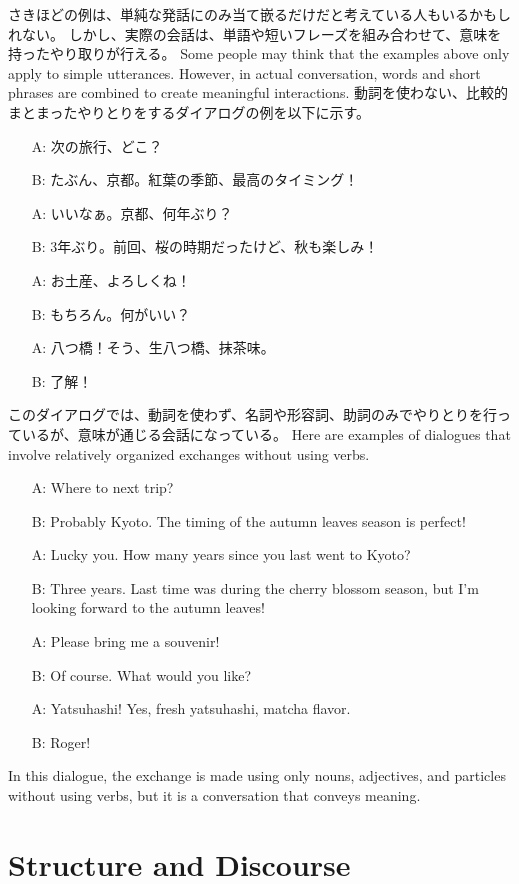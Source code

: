 \documentclass[uplatex,dvipdfmx,b5paper,english,10pt]{jsbook}
\begin{document}
\ifJapanese
  さきほどの例は、単純な発話にのみ当て嵌るだけだと考えている人もいるかもしれない。
  しかし、実際の会話は、単語や短いフレーズを組み合わせて、意味を持ったやり取りが行える。
\else
  Some people may think that the examples above only apply to simple utterances.
  However, in actual conversation, words and short phrases are combined to create meaningful interactions.
\fi
\ifJapanese
動詞を使わない、比較的まとまったやりとりをするダイアログの例を以下に示す。
\begin{itemize}
  \item[A:] 次の旅行、どこ？
  \item[B:] たぶん、京都。紅葉の季節、最高のタイミング！
  \item[A:] いいなぁ。京都、何年ぶり？
  \item[B:] 3年ぶり。前回、桜の時期だったけど、秋も楽しみ！
  \item[A:] お土産、よろしくね！
  \item[B:] もちろん。何がいい？
  \item[A:] 八つ橋！そう、生八つ橋、抹茶味。
  \item[B:] 了解！
\end{itemize}
このダイアログでは、動詞を使わず、名詞や形容詞、助詞のみでやりとりを行っているが、意味が通じる会話になっている。
\else
Here are examples of dialogues that involve relatively organized exchanges without using verbs.
\begin{itemize}
  \item[A:] Where to next trip?
  \item[B:] Probably Kyoto. The timing of the autumn leaves season is perfect!
  \item[A:] Lucky you. How many years since you last went to Kyoto?
  \item[B:] Three years. Last time was during the cherry blossom season, but I'm looking forward to the autumn leaves!
  \item[A:] Please bring me a souvenir!
  \item[B:] Of course. What would you like?
  \item[A:] Yatsuhashi! Yes, fresh yatsuhashi, matcha flavor.
  \item[B:] Roger!
\end{itemize}
In this dialogue, the exchange is made using only nouns, adjectives, and particles without using verbs, but it is a conversation that conveys meaning.
\fi

\ifEnglish
\section{Structure and Discourse}
\else
\end{document}
